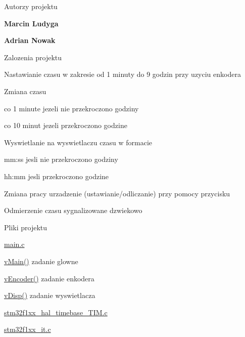\label{index_md_E__Nowy_folder_RTOS_przyklad_5_README}%
%
 Autorzy projektu
\begin{DoxyItemize}
\item {\bfseries{Marcin Ludyga}}
\item {\bfseries{Adrian Nowak}}
\end{DoxyItemize}



Zalozenia projektu


\begin{DoxyItemize}
\item Nastawianie czasu w zakresie od 1 minuty do 9 godzin przy uzyciu enkodera
\item Zmiana czasu
\begin{DoxyItemize}
\item co 1 minute jezeli nie przekroczono godziny
\item co 10 minut jezeli przekroczono godzine
\end{DoxyItemize}
\item Wyswietlanie na wyswietlaczu czasu w formacie
\begin{DoxyItemize}
\item mm\+:ss jesli nie przekroczono godziny
\item hh\+:mm jesli przekroczono godzine
\end{DoxyItemize}
\item Zmiana pracy urzadzenie (ustawianie/odliczanie) przy pomocy przycisku
\item Odmierzenie czasu sygnalizowane dzwiekowo 

\end{DoxyItemize}

Pliki projektu


\begin{DoxyItemize}
\item \mbox{\hyperlink{main_8c}{main.\+c}}
\begin{DoxyItemize}
\item \mbox{\hyperlink{main_8c_a5e21660a915e0df1ed89a4b0ebd96dbb}{v\+Main()}} zadanie glowne
\item \mbox{\hyperlink{main_8c_a5db7f5a5c7eb704581e362ef415335d1}{v\+Encoder()}} zadanie enkodera
\item \mbox{\hyperlink{main_8c_a4a15624dddb788794cd2b33858cdcd13}{v\+Disp()}} zadanie wyswietlacza
\end{DoxyItemize}
\item \mbox{\hyperlink{stm32f1xx__hal__timebase___t_i_m_8c}{stm32f1xx\+\_\+hal\+\_\+timebase\+\_\+\+TIM.\+c}}
\item \mbox{\hyperlink{stm32f1xx__it_8c}{stm32f1xx\+\_\+it.\+c}}
\end{DoxyItemize}

 